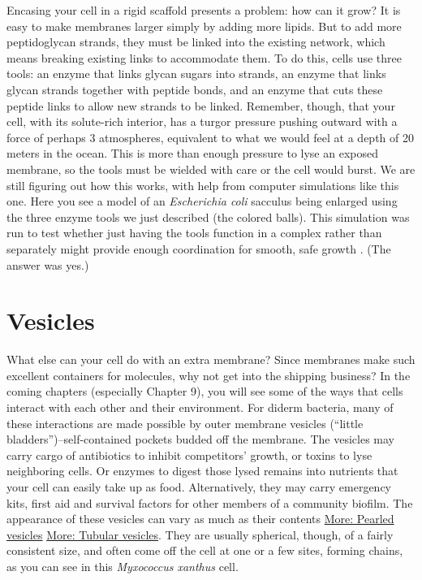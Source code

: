 \documentclass[]{tufte-book}
\begin{document}
Encasing your cell in a rigid scaffold presents a problem: how can it
grow? It is easy to make membranes larger simply by adding more lipids.
But to add more peptidoglycan strands, they must be linked into the
existing network, which means breaking existing links to accommodate
them. To do this, cells use three tools: an enzyme that links glycan
sugars into strands, an enzyme that links glycan strands together with
peptide bonds, and an enzyme that cuts these peptide links to allow new
strands to be linked. Remember, though, that your cell, with its
solute-rich interior, has a turgor pressure pushing outward with a force
of perhaps 3 atmospheres, equivalent to what we would feel at a depth of
20 meters in the ocean. This is more than enough pressure to lyse an
exposed membrane, so the tools must be wielded with care or the cell
would burst. We are still figuring out how this works, with help from
computer simulations like this one. Here you see a model of an
\emph{Escherichia coli} sacculus being enlarged using the three enzyme
tools we just described (the colored balls). This simulation was run to
test whether just having the tools function in a complex rather than
separately might provide enough coordination for smooth, safe growth
\citep{nguyen2015}. (The answer was yes.)

\section{Vesicles}\label{vesicles}

What else can your cell do with an extra membrane? Since membranes make
such excellent containers for molecules, why not get into the shipping
business? In the coming chapters (especially Chapter 9), you will see
some of the ways that cells interact with each other and their
environment. For diderm bacteria, many of these interactions are made
possible by outer membrane vesicles (``little
bladders'')--self-contained pockets budded off the membrane. The
vesicles may carry cargo of antibiotics to inhibit competitors' growth,
or toxins to lyse neighboring cells. Or enzymes to digest those lysed
remains into nutrients that your cell can easily take up as food.
Alternatively, they may carry emergency kits, first aid and survival
factors for other members of a community biofilm. The appearance of
these vesicles can vary as much as their contents
\protect\hyperlink{Pearled_vesicles}{More: Pearled vesicles}
\protect\hyperlink{Tubular_vesicles}{More: Tubular vesicles}. They are
usually spherical, though, of a fairly consistent size, and often come
off the cell at one or a few sites, forming chains, as you can see in
this \emph{Myxococcus xanthus} cell.
\end{document}
